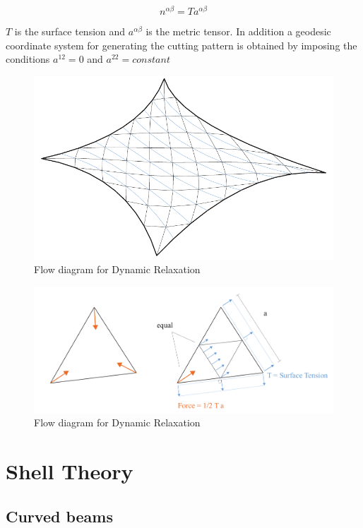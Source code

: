 \begin{equation}
    n^{\alpha \beta} = Ta^{\alpha \beta}
\end{equation}

$T$ is the surface tension and $a^{\alpha \beta}$ is the metric tensor. In addition a geodesic coordinate system for generating the cutting pattern is obtained by imposing the conditions $a^{12} = 0$ and  $a^{22} = constant$


\begin{figure}[H]
\centering
\includegraphics[width=0.9\linewidth ]{figure/Theory/EqualMeshGeo.pdf}
\caption{Flow diagram for Dynamic Relaxation }
\end{figure}


\begin{figure}[H]
\centering
\includegraphics[width=1.0\linewidth ]{figure/Theory/SoapbubbleElement.pdf}
\caption{Flow diagram for Dynamic Relaxation }
\end{figure}


\section{Shell Theory}




\subsection{Curved beams}

